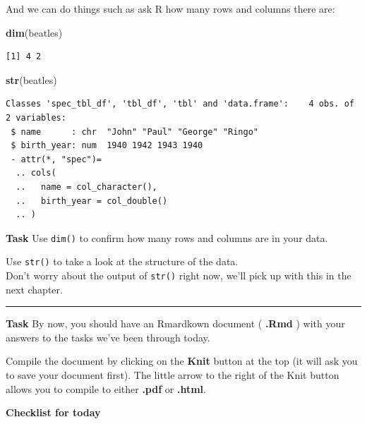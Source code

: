 \documentclass[]{book}
\newenvironment{Shaded}{\begin{snugshade}}{\end{snugshade}}
\newcommand{\KeywordTok}[1]{\textcolor[rgb]{0.13,0.29,0.53}{\textbf{#1}}}
\newcommand{\NormalTok}[1]{#1}
\begin{document}
And we can do things such as ask R how many rows and columns there are:

\begin{Shaded}
\begin{Highlighting}[]
\KeywordTok{dim}\NormalTok{(beatles)}
\end{Highlighting}
\end{Shaded}

\begin{verbatim}
[1] 4 2
\end{verbatim}

\begin{Shaded}
\begin{Highlighting}[]
\KeywordTok{str}\NormalTok{(beatles)}
\end{Highlighting}
\end{Shaded}

\begin{verbatim}
Classes 'spec_tbl_df', 'tbl_df', 'tbl' and 'data.frame':    4 obs. of  2 variables:
 $ name      : chr  "John" "Paul" "George" "Ringo"
 $ birth_year: num  1940 1942 1943 1940
 - attr(*, "spec")=
  .. cols(
  ..   name = col_character(),
  ..   birth_year = col_double()
  .. )
\end{verbatim}

\textbf{Task}
Use \texttt{dim()} to confirm how many rows and columns are in your data.

Use \texttt{str()} to take a look at the structure of the data.\\
Don't worry about the output of \texttt{str()} right now, we'll pick up with this in the next chapter.

\begin{center}\rule{0.5\linewidth}{0.5pt}\end{center}

\textbf{Task}
By now, you should have an Rmardkown document ( \textbf{.Rmd} ) with your answers to the tasks we've been through today.

Compile the document by clicking on the \textbf{Knit} button at the top (it will ask you to save your document first). The little arrow to the right of the Knit button allows you to compile to either \textbf{.pdf} or \textbf{.html}.

\textbf{Checklist for today}
\end{document}
